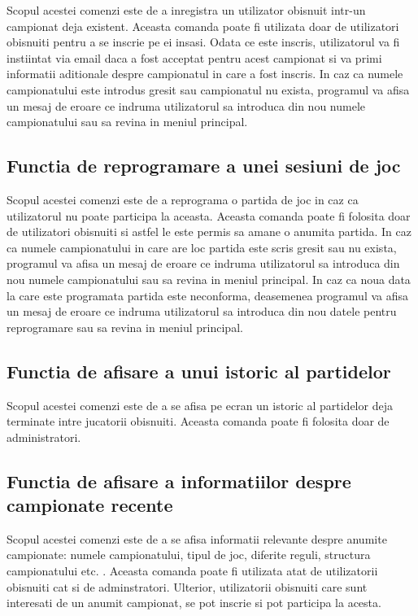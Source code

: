 \documentclass{article}
\begin{document}
\quad Scopul acestei comenzi este de a inregistra un utilizator obisnuit intr-un campionat deja existent. Aceasta comanda poate fi utilizata doar de utilizatori obisnuiti pentru a se inscrie pe ei insasi. Odata ce este inscris, utilizatorul va fi instiintat via email daca a fost acceptat pentru acest campionat si va primi informatii aditionale despre campionatul in care a fost inscris. In caz ca numele campionatului este introdus gresit sau campionatul nu exista, programul va afisa un mesaj de eroare ce indruma utilizatorul sa introduca din nou numele campionatului sau sa revina in meniul principal.

\subsection{Functia de reprogramare a unei sesiuni de joc}

\quad Scopul acestei comenzi este de a reprograma o partida de joc in caz ca utilizatorul nu poate participa la aceasta. Aceasta comanda poate fi folosita doar de utilizatori obisnuiti si astfel le este permis sa amane o anumita partida. In caz ca numele campionatului in care are loc partida este scris gresit sau nu exista, programul va afisa un mesaj de eroare ce indruma utilizatorul sa introduca din nou numele campionatului sau sa revina in meniul principal. In caz ca noua data la care este programata partida este neconforma, deasemenea programul va afisa un mesaj de eroare ce indruma utilizatorul sa introduca din nou datele pentru reprogramare sau sa revina in meniul principal.

\subsection{Functia de afisare a unui istoric al partidelor}

\quad Scopul acestei comenzi este de a se afisa pe ecran un istoric al partidelor deja terminate intre jucatorii obisnuiti. Aceasta comanda poate fi folosita doar de administratori.

\subsection{Functia de afisare a informatiilor despre campionate recente}

\quad Scopul acestei comenzi este de a se afisa informatii relevante despre anumite campionate: numele campionatului, tipul de joc, diferite reguli, structura campionatului etc. . Aceasta comanda poate fi utilizata atat de utilizatorii obisnuiti cat si de adminstratori. Ulterior, utilizatorii obisnuiti care sunt interesati de un anumit campionat, se pot inscrie si pot participa la acesta. 
\end{document}
